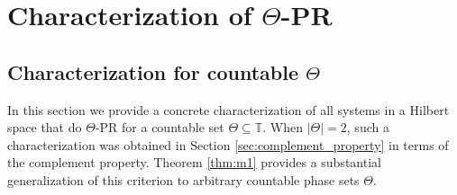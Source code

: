 \documentclass[reqno,a4paper,11pt]{amsart}
\numberwithin{equation}{section}
\def\T{{\mathbb T}}
\newcommand\1{\mathds{1}}
\begin{document}
\section{Characterization of $\Theta$-PR}\label{sec:characteriztion}

\subsection{Characterization for countable $\Theta$}

In this section we provide a concrete characterization of all systems in a Hilbert space that do $\Theta$-PR for a countable set $\Theta\subseteq \T$. When $|\Theta| = 2$, such a characterization was obtained in Section \ref{sec:complement_property} in terms of the complement property. Theorem \ref{thm:m1} provides a substantial generalization of this criterion to arbitrary countable phase sets $\Theta$. 
\end{document}
